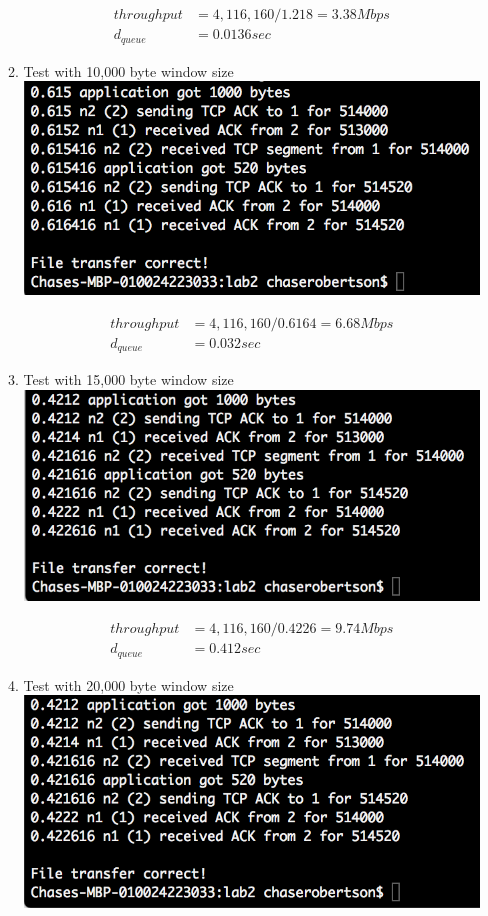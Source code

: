 \documentclass[fleqn,11pt]{article}
\begin{document}
\begin{enumerate}
\begin{enumerate}
\begin{align*}
throughput &= 4,116,160 / 1.218 = 3.38Mbps \\
d_{queue} &= 0.0136 sec
\end{align*}

\item Test with 10,000 byte window size \\
\includegraphics{queue10000.png}

\begin{align*}
throughput &= 4,116,160 / 0.6164 = 6.68Mbps \\
d_{queue} &= 0.032 sec
\end{align*}

\item Test with 15,000 byte window size \\
\includegraphics{queue15000.png}

\begin{align*}
throughput &= 4,116,160 / 0.4226 = 9.74Mbps \\
d_{queue} &= 0.412 sec
\end{align*}

\item Test with 20,000 byte window size \\
\includegraphics{queue20000.png}


\end{enumerate}
\end{enumerate}
\end{document}

